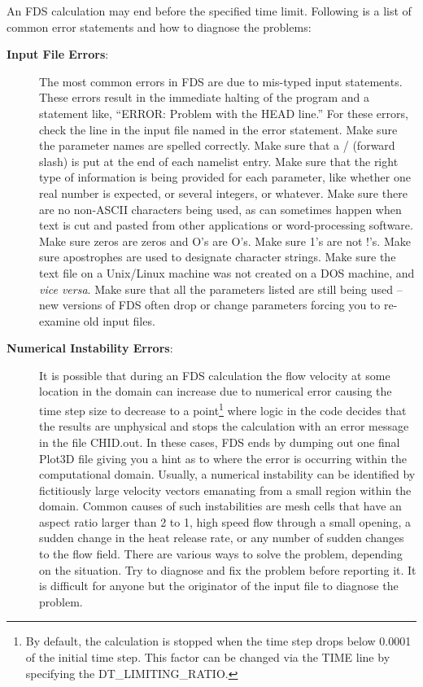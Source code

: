 \documentclass[11pt]{book}
\begin{document}
An FDS calculation may end before the specified time limit.
Following is a list of common error statements and how to diagnose the problems:
\begin{description}
\item[{\bf Input File Errors}:]
The most common errors in FDS are due to mis-typed input statements.
These errors result in the immediate halting of the program and a statement like, ``ERROR: Problem
with the HEAD line.'' For these errors, check the line in the input file named in the error statement.
Make sure the parameter names are spelled correctly. Make sure that a / (forward slash)
is put at the end of each namelist entry. Make sure that the right type of information is
being provided for each parameter, like whether one real number is expected, or several integers, or
whatever. Make sure there are no non-ASCII characters being used, as can sometimes happen when text is
cut and pasted from other applications or word-processing software. Make sure zeros are zeros and
O's are O's. Make sure 1's are not !'s. Make sure apostrophes are used to designate character strings.
Make sure the text file on a Unix/Linux machine was not created on a DOS machine, and {\em vice versa}.
Make sure that all the parameters listed are still being used -- new versions of FDS often drop or
change parameters forcing you to re-examine old input files.

\item [{\bf Numerical Instability Errors}:]
It is possible that during an FDS calculation the flow
velocity at some location in the domain can increase due to numerical error causing the time step
size to decrease to a point\footnote{By default, the calculation is stopped when the time step drops below 0.0001 of the initial time step. This
factor can be changed via the {\ct TIME} line by specifying the {\ct DT\_LIMITING\_RATIO}.} where logic in the code decides that the results are unphysical
and stops the calculation with an error message in the file {\ct CHID.out}.
In these cases, FDS ends by dumping out one final
Plot3D file giving you a hint as to where the
error is occurring within the computational domain. Usually, a numerical
instability can be identified by fictitiously large velocity vectors emanating from
a small region within the domain. Common causes of such instabilities are
mesh cells that have an aspect ratio larger than 2 to 1, high speed flow through a small
opening, a sudden change in the heat release rate, or any number of sudden changes to the
flow field. There are various ways to solve the problem, depending on the situation.
Try to diagnose and fix the problem before reporting it. It is difficult
for anyone but the originator of the input file to diagnose the problem.


\end{description}
\end{document}
